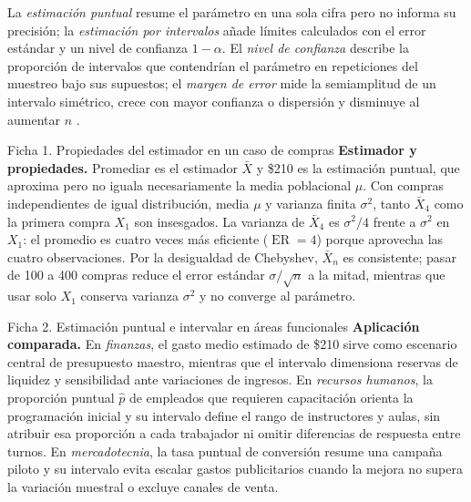 La \textit{estimación puntual} resume el parámetro en una sola cifra pero no informa su precisión; la \textit{estimación por intervalos} añade límites calculados con el error estándar y un nivel de confianza $1-\alpha$. El \textit{nivel de confianza} describe la proporción de intervalos que contendrían el parámetro en repeticiones del muestreo bajo sus supuestos; el \textit{margen de error} mide la semiamplitud de un intervalo simétrico, crece con mayor confianza o dispersión y disminuye al aumentar $n$ \citep{holmesBusiness2023,nistHandbook}.

\begin{fichainvestigacion}{Ficha 1. Propiedades del estimador en un caso de compras}
\textbf{Estimador y propiedades.} Promediar es el estimador $\bar{X}$ y \$210 es la estimación puntual, que aproxima pero no iguala necesariamente la media poblacional $\mu$. Con compras independientes de igual distribución, media $\mu$ y varianza finita $\sigma^2$, tanto $\bar{X}_4$ como la primera compra $X_1$ son insesgados. La varianza de $\bar{X}_4$ es $\sigma^2/4$ frente a $\sigma^2$ en $X_1$: el promedio es cuatro veces más eficiente ($\operatorname{ER}=4$) porque aprovecha las cuatro observaciones. Por la desigualdad de Chebyshev, $\bar{X}_n$ es consistente; pasar de 100 a 400 compras reduce el error estándar $\sigma/\sqrt{n}$ a la mitad, mientras que usar solo $X_1$ conserva varianza $\sigma^2$ y no converge al parámetro.
\end{fichainvestigacion}

\begin{fichainvestigacion}{Ficha 2. Estimación puntual e intervalar en áreas funcionales}
\textbf{Aplicación comparada.} En \textit{finanzas}, el gasto medio estimado de \$210 sirve como escenario central de presupuesto maestro, mientras que el intervalo dimensiona reservas de liquidez y sensibilidad ante variaciones de ingresos. En \textit{recursos humanos}, la proporción puntual $\hat{p}$ de empleados que requieren capacitación orienta la programación inicial y su intervalo define el rango de instructores y aulas, sin atribuir esa proporción a cada trabajador ni omitir diferencias de respuesta entre turnos. En \textit{mercadotecnia}, la tasa puntual de conversión resume una campaña piloto y su intervalo evita escalar gastos publicitarios cuando la mejora no supera la variación muestral o excluye canales de venta.
\end{fichainvestigacion}


